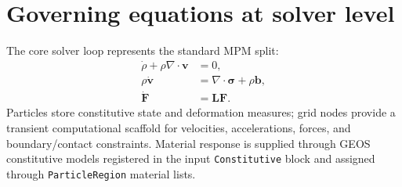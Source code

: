 \section{Governing equations at solver level}
The core solver loop represents the standard MPM split:
\begin{align*}
  \dot{\rho} + \rho \nabla \cdot \mathbf{v} &= 0, \\
  \rho \dot{\mathbf{v}} &= \nabla \cdot \boldsymbol{\sigma} + \rho \mathbf{b}, \\
  \dot{\mathbf{F}} &= \mathbf{L}\mathbf{F}.
\end{align*}
Particles store constitutive state and deformation measures; grid nodes provide a transient computational scaffold for velocities, accelerations, forces, and boundary/contact constraints.  Material response is supplied through GEOS constitutive models registered in the input \texttt{Constitutive} block and assigned through \texttt{ParticleRegion} material lists.

